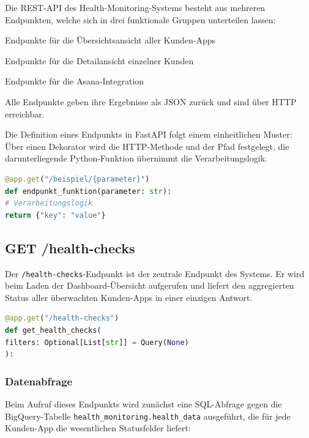 Die REST-API des Health-Monitoring-Systems besteht aus mehreren Endpunkten, welche sich in drei funktionale Gruppen unterteilen lassen:

\begin{compactitem}
    \item Endpunkte für die Übersichtsansicht aller Kunden-Apps
    \item Endpunkte für die Detailansicht einzelner Kunden
    \item Endpunkte für die Asana-Integration
\end{compactitem}

Alle Endpunkte geben ihre Ergebnisse als JSON zurück und sind über HTTP erreichbar.

Die Definition eines Endpunkts in FastAPI folgt einem einheitlichen Muster: Über einen Dekorator wird die HTTP-Methode und der Pfad festgelegt, die darunterliegende Python-Funktion übernimmt die Verarbeitungslogik.

\begin{lstlisting}[language=Python, caption={Grundstruktur eines FastAPI-Endpunkts}, label={lst:fastapi-endpoint}]
@app.get("/beispiel/{parameter}")
def endpunkt_funktion(parameter: str):
# Verarbeitungslogik
return {"key": "value"}
\end{lstlisting}

\subsection{GET /health-checks}
Der \texttt{/health-checks}-Endpunkt ist der zentrale Endpunkt des Systems. Er wird beim Laden der Dashboard-Übersicht aufgerufen und liefert den aggregierten Status aller überwachten Kunden-Apps in einer einzigen Antwort.

\begin{lstlisting}[language=Python, caption={Definition des /health-checks Endpunkts}, label={lst:health-checks-def}]
@app.get("/health-checks")
def get_health_checks(
filters: Optional[List[str]] = Query(None)
):
\end{lstlisting}

\subsubsection{Datenabfrage}
Beim Aufruf dieses Endpunkts wird zunächst eine SQL-Abfrage gegen die BigQuery-Tabelle \texttt{health\_monitoring.health\_data} ausgeführt, die für jede Kunden-App die wesentlichen Statusfelder liefert:

